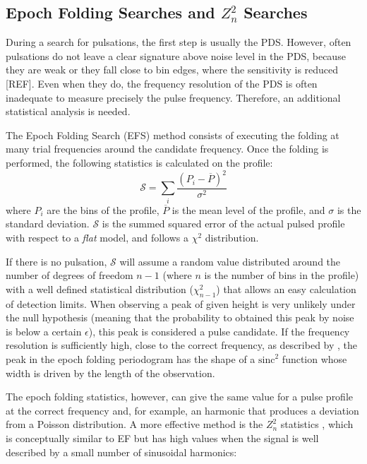 \documentclass[twocolumn]{aastex62}
\newcommand{\zsq}{\ensuremath{Z^2_n}\xspace}
\begin{document}
\subsection{Epoch Folding Searches and \zsq Searches}
\label{sec:efzsq}
During a search for pulsations, the first step is usually the PDS. 
However, often pulsations do not leave a clear signature above noise level in the PDS, because they are weak or they fall close to bin edges, where the sensitivity is reduced [REF].
Even when they do, the frequency resolution of the PDS is often inadequate to measure precisely the pulse frequency.
Therefore, an additional statistical analysis is needed. 

The Epoch Folding Search (EFS) method consists of executing the folding at many trial frequencies around the candidate frequency.
Once the folding is performed, the following statistics is calculated on the profile:
\begin{equation}
\mathcal{S} = \sum_i\frac{(P_i - \overline{P})^2}{\sigma^2}
\end{equation}
where $P_i$ are the bins of the profile, $\overline{P}$ is the mean level of the profile, and $\sigma$ is the standard deviation.
$\mathcal{S}$ is the summed squared error of the actual pulsed profile with respect to a \textit{flat} model, and follows a $\chi^2$ distribution.

If there is no pulsation, $\mathcal{S}$ will assume a random value distributed around the number of degrees of freedom $n - 1$ (where $n$ is the number of bins in the profile) with a well defined statistical distribution ($\chi^2_{n - 1}$) that allows an easy calculation of detection limits. 
When observing a peak of given height is very unlikely under the null hypothesis (meaning that the probability to obtained this peak by noise is below a certain $\epsilon$), this peak is considered a pulse candidate.
If the frequency resolution is sufficiently high, close to the correct frequency, as described by \citep{leahy1983b,leahy1987}, the peak in the epoch folding periodogram has the shape of a $\mathrm{sinc}^2$ function whose width is driven by the length of the observation.

The epoch folding statistics, however, can give the same value for a pulse profile at the correct frequency and, for example, an harmonic that produces a deviation from a Poisson distribution.
A more effective method is the $Z^2_n$ statistics \citep{buccheri1983}, which is conceptually similar to EF but has high values when the signal is well described by a small number of sinusoidal harmonics: 
\end{document}

